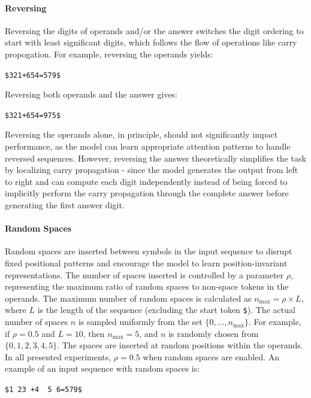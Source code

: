 \paragraph{Reversing}
Reversing the digits of operands and/or the answer switches the digit ordering to start with least significant digits, which follows the flow of operations like carry propogation. For example, reversing the operands yields:
\begin{center}
  \verb|$321+654=579$|
\end{center}
Reversing both operands and the answer gives:
\begin{center}
  \verb|$321+654=975$|
\end{center}
Reversing the operands alone, in principle, should not significantly impact performance, as the model can learn appropriate attention patterns to handle reversed sequences. However, reversing the answer theoretically simplifies the task by localizing carry propagation - since the model generates the output from left to right and can compute each digit independently instead of being forced to implicitly perform the carry propagation through the complete answer before generating the first answer digit.

\paragraph{Random Spaces}
Random spaces are inserted between symbols in the input sequence to disrupt fixed positional patterns and encourage the model to learn position-invariant representations. The number of spaces inserted is controlled by a parameter $\rho$, representing the maximum ratio of random spaces to non-space tokens in the operands. The maximum number of random spaces is calculated as $n_{\text{max}} = \rho \times L$, where $L$ is the length of the sequence (excluding the start token \texttt{\$}). The actual number of spaces $n$ is sampled uniformly from the set $\{0, \dots, n_{\text{max}}\}$. For example, if $\rho = 0.5$ and $L = 10$, then $n_{\text{max}} = 5$, and $n$ is randomly chosen from $\{0, 1, 2, 3, 4, 5\}$. The spaces are inserted at random positions within the operands. In all presented experiments, $\rho = 0.5$ when random spaces are enabled. An example of an input sequence with random spaces is:
\begin{center}
  \verb|$1 23 +4  5 6=579$|
\end{center}

